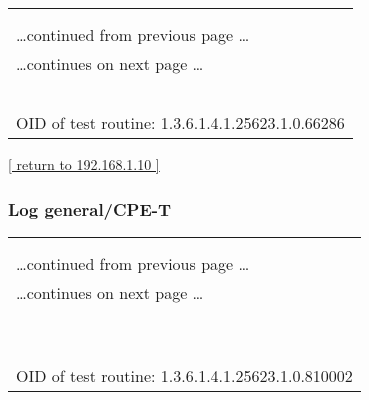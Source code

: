 \documentclass{article}
\begin{document}
\begin{longtable}{|p{}|}
\hline
\rowcolor{openvas_log}{\color{white}{Log (CVSS: 0.0) }}\\
\rowcolor{openvas_log}{\color{white}{NVT: Identify unknown services with nmap}}\\
\hline
\endfirsthead
\hfill\ldots continued from previous page \ldots \\
\hline
\endhead
\hline
\ldots continues on next page \ldots \\
\endfoot
\hline
\endlastfoot
\\
\rowcolor{white}{\verb=Nmap service detection result for this port: domain=}\\
\rowcolor{white}{\verb==}\\
\rowcolor{white}{\verb==}\\
\\
OID of test routine: 1.3.6.1.4.1.25623.1.0.66286\\
\end{longtable}

\begin{footnotesize}\hyperref[host:192.168.1.10]{[ return to 192.168.1.10 ]}\end{footnotesize}
\subsubsection{Log general/CPE-T}
\label{port:192.168.1.10 general/CPE-T Log}

\begin{longtable}{|p{}|}
\hline
\rowcolor{openvas_log}{\color{white}{Log (CVSS: 0.0) }}\\
\rowcolor{openvas_log}{\color{white}{NVT: CPE Inventory}}\\
\hline
\endfirsthead
\hfill\ldots continued from previous page \ldots \\
\hline
\endhead
\hline
\ldots continues on next page \ldots \\
\endfoot
\hline
\endlastfoot
\\
\rowcolor{white}{\verb=192.168.1.10|cpe:/a:samba:samba:3.4.7=}\\
\rowcolor{white}{\verb=192.168.1.10|cpe:/a:apache:tomcat:6.0.24=}\\
\rowcolor{white}{\verb=192.168.1.10|cpe:/a:apache:http_server:2.2.14=}\\
\rowcolor{white}{\verb=192.168.1.10|cpe:/a:openbsd:openssh:5.3p1=}\\
\rowcolor{white}{\verb=192.168.1.10|cpe:/o:canonical:ubuntu_linux=}\\
\rowcolor{white}{\verb==}\\
\rowcolor{white}{\verb==}\\
\\
OID of test routine: 1.3.6.1.4.1.25623.1.0.810002\\
\end{longtable}
\end{document}

